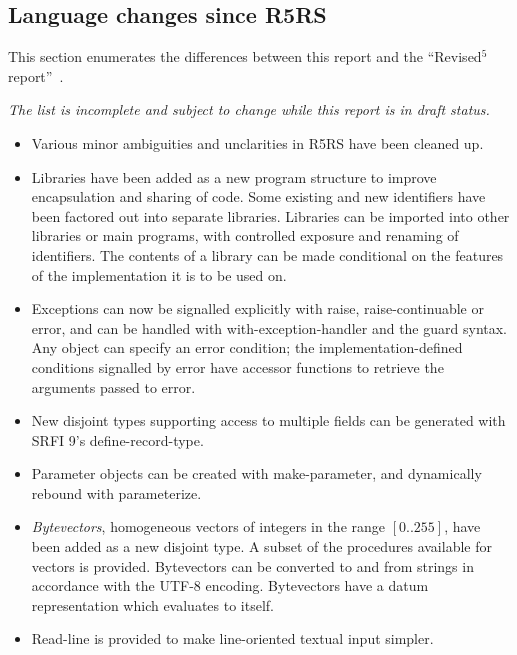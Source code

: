 

\subsection*{Language changes since R5RS}
\label{differences}
This section enumerates the differences between this report and
the ``Revised$^5$ report''~\cite{R5RS}.

{\em The list is incomplete and subject to change while this report is in draft status.}


\begin{itemize}

\item Various minor ambiguities and unclarities in R5RS have been cleaned up.

\item Libraries have been added as a new program structure to improve
encapsulation and sharing of code.  Some existing and new identifiers
have been factored out into separate libraries.
Libraries can be imported into other libraries or main programs, with
controlled exposure and renaming of identifiers.
The contents of a library can be made conditional on the features of
the implementation it is to be used on.

\item Exceptions can now be signalled explicitly with {\cf raise},
{\cf raise-continuable} or {\cf error}, and can be handled with {\cf
with-exception-handler} and the {\cf guard} syntax.
Any object can specify an error condition; the implementation-defined
conditions signalled by {\cf error} have accessor functions to
retrieve the arguments passed to {\cf error}.

\item New disjoint types supporting access to multiple fields can be
generated with SRFI 9's {\cf define-record-type}.

\item Parameter objects can be created with {\cf make-parameter}, and
dynamically rebound with {\cf parameterize}.

\item {\em Bytevectors}, homogeneous vectors of integers in the range
$[0..255]$, have been added as a new disjoint type.
A subset of the procedures available for vectors is provided.  Bytevectors
can be converted to and from strings in accordance with the UTF-8 encoding.
Bytevectors have a datum representation which evaluates to itself.

\item {\cf Read-line} is provided to make line-oriented textual input
simpler.


\end{itemize}
